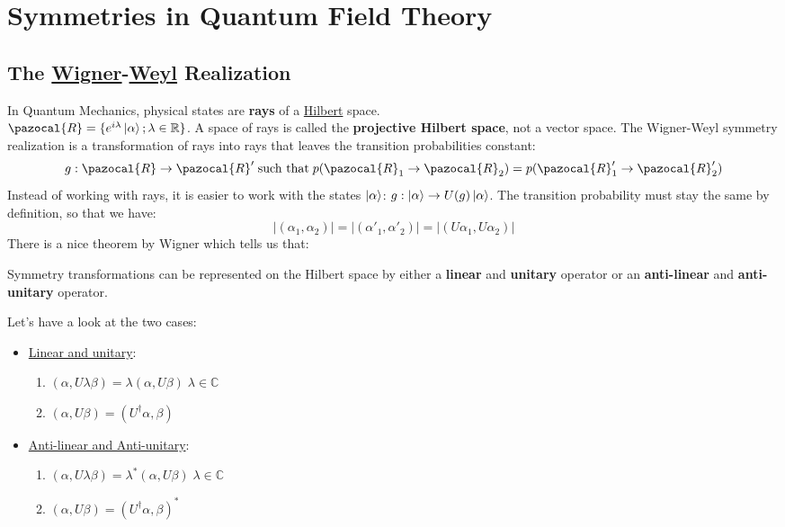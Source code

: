 \documentclass[../main.tex]{subfiles}
\begin{document}
\setchapterpreamble[u]{\margintoc}
\chapter[Symmetries in Quantum Field Theory]{Symmetries in Quantum Field Theory\footnotemark[0]}
\section{The \href{https://en.wikipedia.org/wiki/Eugene_Wigner}{Wigner}-\href{https://en.wikipedia.org/wiki/Hermann_Weyl}{Weyl} Realization}
In Quantum Mechanics, physical states are \textbf{rays} of a \href{https://en.wikipedia.org/wiki/David_Hilbert}{Hilbert} space.\\
$\pazocal{R}=\{e^{i\lambda}\ket{\alpha};\lambda\in\mathbb{R}\}$. A space of rays is called the \textbf{projective Hilbert space}, not a vector space. The Wigner-Weyl symmetry realization is a transformation of rays into rays that leaves the transition probabilities constant:
\[
g:\pazocal{R}\to\pazocal{R}' \;\text{such that}\;p(\pazocal{R}_1\to\pazocal{R}_2)=p(\pazocal{R}'_1\to\pazocal{R}'_2)
\]
Instead of working with rays, it is easier to work with the states $\ket{\alpha}$: $g:\ket{\alpha}\to U(g)\ket{\alpha}$. The transition probability must stay the same by definition, so that we have:
\[
|(\alpha_1,\alpha_2)|=|(\alpha'_1,\alpha'_2)|=|(U\alpha_1,U\alpha_2)|
\]
There is a nice theorem by Wigner which tells us that:
\begin{theorem}[Wigner]
Symmetry transformations can be represented on the Hilbert space by either a \textbf{linear} and \textbf{unitary} operator or an \textbf{anti-linear} and \textbf{anti-unitary} operator.
\end{theorem}
Let's have a look at the two cases:
\begin{itemize}
    \item \underline{Linear and unitary}:
    \begin{enumerate}
        \item $(\alpha,U\lambda\beta)=\lambda(\alpha,U\beta)\;\lambda\in\mathbb{C}$
        \item $(\alpha,U\beta)=(U^\dagger\alpha,\beta)$
    \end{enumerate}
    \item \underline{Anti-linear and Anti-unitary}:
    \begin{enumerate}
        \item $(\alpha,U\lambda\beta)=\lambda^*(\alpha,U\beta)\;\lambda\in\mathbb{C}$
        \item $(\alpha,U\beta)=(U^\dagger\alpha,\beta)^*$
    \end{enumerate}
\end{itemize}
\end{document}
